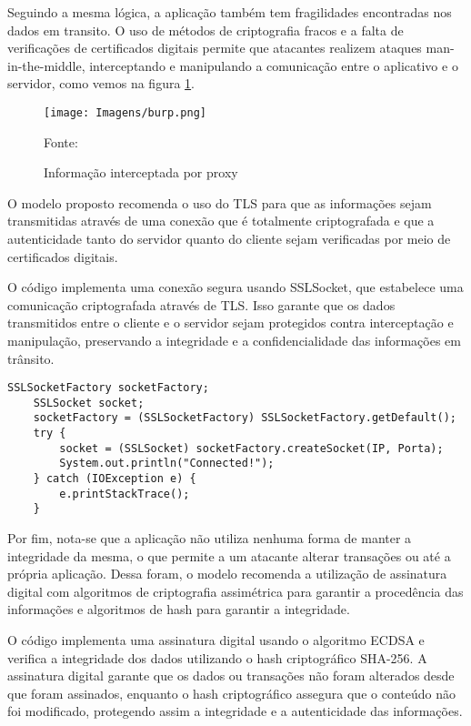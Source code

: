     Seguindo a mesma lógica, a aplicação também tem fragilidades encontradas nos dados em transito. O uso de métodos de criptografia fracos e a falta de verificações de certificados digitais permite que atacantes realizem ataques man-in-the-middle, interceptando e manipulando a comunicação entre o aplicativo e o servidor, como vemos na figura \ref{burp}. 

    \begin{figure}[H]
    \centering 
    \texttt{[image: Imagens/burp.png]} 
    \caption{Informação interceptada por proxy}
    Fonte: 
    \label{burp}
    \end{figure}

    O modelo proposto recomenda o uso do TLS para que as informações sejam transmitidas através de uma conexão que é totalmente criptografada e que a autenticidade tanto do servidor quanto do cliente sejam verificadas por meio de certificados digitais. 

    O código implementa uma conexão segura usando SSLSocket, que estabelece uma comunicação criptografada através de TLS. Isso garante que os dados transmitidos entre o cliente e o servidor sejam protegidos contra interceptação e manipulação, preservando a integridade e a confidencialidade das informações em trânsito.
    \\

    \begin{scriptsize}
    \estiloJava
    \begin{lstlisting}[caption={Conexão criptografada com SSLSocket}, label=lst:javacode]
    SSLSocketFactory socketFactory;
    SSLSocket socket;
    socketFactory = (SSLSocketFactory) SSLSocketFactory.getDefault();
    try {
        socket = (SSLSocket) socketFactory.createSocket(IP, Porta);
        System.out.println("Connected!");
    } catch (IOException e) {
        e.printStackTrace();
    }
    \end{lstlisting}
    \end{scriptsize}

    
    Por fim, nota-se que a aplicação não utiliza nenhuma forma de manter a integridade da mesma, o que permite a um atacante alterar transações ou até a própria aplicação. Dessa foram, o modelo recomenda a utilização de assinatura digital com algoritmos de criptografia assimétrica para garantir a procedência das informações e algoritmos de hash para garantir a integridade. 

    O código implementa uma assinatura digital usando o algoritmo ECDSA e verifica a integridade dos dados utilizando o hash criptográfico SHA-256. A assinatura digital garante que os dados ou transações não foram alterados desde que foram assinados, enquanto o hash criptográfico assegura que o conteúdo não foi modificado, protegendo assim a integridade e a autenticidade das informações.
    \\

